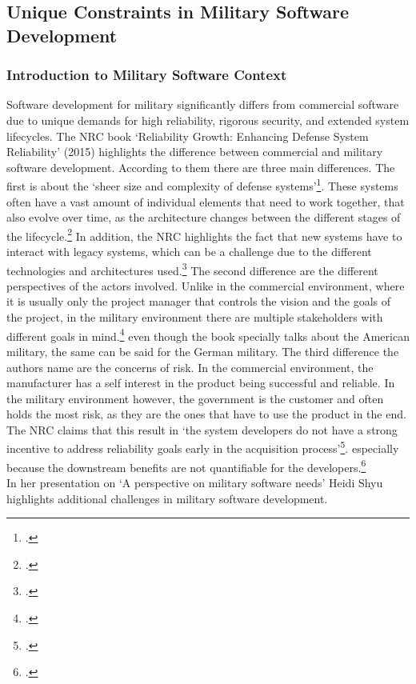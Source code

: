 \subsection{Unique Constraints in Military Software Development}
\subsubsection{Introduction to Military Software Context}
Software development for military significantly differs from commercial software due to unique demands for high reliability, rigorous security, and extended system lifecycles.
The \ac{NRC} book `Reliability Growth: Enhancing Defense System Reliability' (2015) highlights the difference between commercial and military software development.
According to them there are three main differences. The first is about the `sheer size and complexity of defense systems'\footcite[31]{nrc2015defense}.
These systems often have a vast amount of individual elements that need to work together, that also evolve over time, as the architecture changes between the different stages of 
the lifecycle.\footcite[32]{nrc2015defense} In addition, the \ac{NRC} highlights the fact that new systems have to interact with legacy systems, which can be a challenge
due to the different technologies and architectures used.\footcite[32]{nrc2015defense}
The second difference are the different perspectives of the actors involved. Unlike in the commercial environment, where it is usually only the project manager 
that controls the vision and the goals of the project, in the military environment there are multiple stakeholders with different goals in mind.\footcite[32]{nrc2015defense}
even though the book specially talks about the American military, the same can be said for the German military.
The third difference the authors name are the concerns of risk. In the commercial environment, the manufacturer has a self interest in the product being successful and reliable.
In the military environment however, the government is the customer and often holds the most risk, as they are the ones that have to use the product in the end.
The NRC claims that this result in `the system developers do not have a strong incentive to address reliability goals early in the acquisition process'\footcite[33]{nrc2015defense}.
especially because the downstream benefits are not quantifiable for the developers.\footcite[33]{nrc2015defense}\\
In her presentation on `A perspective on military software needs' Heidi Shyu highlights additional challenges in military software development.
